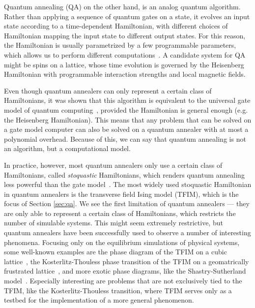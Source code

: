 \documentclass[12pt,a4paper]{article}
\begin{document}
\hspace*{0.3cm}
Quantum annealing (QA) on the other hand, is an analog quantum algorithm. Rather than applying a sequence of
quantum gates on a state, it evolves an input state according to a time-dependent Hamiltonian, with different choices
of Hamiltonian mapping the input state to different output states. For this reason, the Hamiltonian
is usually parametrized by a few programmable parameters, which allows us to perform different computations~\cite*{albash2018adiabatic}.
A candidate system for QA might be spins on a lattice, whose time evolution is governed by the Heisenberg
Hamiltonian with programmable interaction strengths and local magnetic fields.

\hspace*{0.3cm}
Even though quantum annealers can only represent a certain class of Hamiltonians,
it was shown that this algorithm is equivalent to the universal gate model of quantum computing~\cite{aharonov2008adiabatic},
provided the Hamiltonian is general enough (e.g. the Heisenberg Hamiltonian). This means that any problem that can
be solved on a gate model computer can also be solved on a quantum annealer with at most a polynomial overhead.
Because of this, we can say that quantum annealing is not an algorithm, but a computational model.

\hspace*{0.3cm}
In practice, however, most quantum annealers only use a certain class of Hamiltonians, called \textit{stoquastic} Hamiltonians,
which renders quantum annealing less powerful than the gate model~\cite*{crosson2021prospects}.
The most widely used stoquastic Hamiltonian in quantum annealers is the transverse field Ising model (TFIM),
which is the focus of Section \ref{sec:qa}. We see the first limitation of quantum annealers --- they are only
able to represent a certain class of Hamiltonians, which restricts
the number of simulable systems. This might seem extremely restrictive, but quantum annealers have been
successfully used to observe a number of interesting phenomena. Focusing only on the equilibrium simulations
of physical systems, some well-known examples are the phase diagram
of the TFIM on a cubic lattice~\cite*{harris2018phase}, the Kosterlitz-Thouless
phase transition of the TFIM on a geomatrically frustrated lattice~\cite*{king2018observation}, and more exotic
phase diagrams, like the Shastry-Sutherland model~\cite*{kairys2020simulating}.
Especially interesting are problems that are not exclusively tied to the TFIM, like the Kosterlitz-Thouless
transition, where TFIM serves only as a testbed for the implementation of a more general phenomenon.
\end{document}
